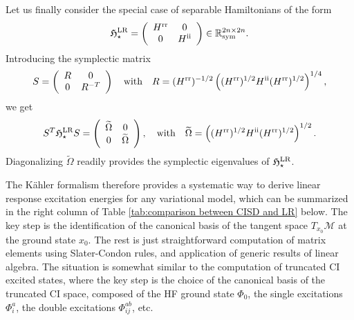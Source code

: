 \documentclass[11pt]{article}
\def\R{{\mathbb R}}
\begin{document}
\par
Let us finally consider the special case of separable Hamiltonians of the form
\begin{equation}\label{eq:separable_Hamiltonians}
\mathfrak H_\star^{\rm LR} = \left( \begin{array}{cc} H^{\rm rr} & 0 \\ 0 &   H^{\rm ii} \end{array} \right) \in \R^{2n \times 2n}_{\rm sym}.
\end{equation}
Introducing the symplectic matrix
$$
S = \left( \begin{array}{cc} R & 0 \\ 0 & R^{-T} \end{array} \right) \quad \mbox{with} \quad R = (H^{\rm rr})^{-1/2} \left( (H^{\rm rr})^{1/2} H^{\rm ii} (H^{\rm rr})^{1/2} \right)^{1/4},
$$
we get 
\begin{equation}\label{eq:angular_frequencies_separable_Hamiltonians}
S^T \mathfrak H_\star^{\rm LR} S =  \left( \begin{array}{cc} \widetilde \Omega & 0 \\ 0 & \widetilde \Omega \end{array} \right), \quad \mbox{with} \quad \widetilde \Omega =  \left( (H^{\rm rr})^{1/2} H^{\rm ii} (H^{\rm rr})^{1/2} \right)^{1/2}.
\end{equation}
Diagonalizing $\widetilde \Omega$ readily provides the symplectic eigenvalues of $\mathfrak H_\star^{\rm LR}$.

\medskip

The K\"ahler formalism therefore provides a systematic way to derive linear response excitation energies for any variational model, which can be summarized in the right column of Table \ref{tab:comparison between CISD and LR} below. The key step is the identification of the canonical basis of the tangent space $T_{x_0}\mathcal M$ at the ground state $x_0$. The rest is just straightforward computation of matrix elements using Slater-Condon rules, and application of generic results of linear algebra.  The situation is somewhat similar to the computation of truncated CI excited states, where the key step is the choice of the canonical basis of the truncated CI space, composed of the HF ground state $\Phi_0$, the single excitations $\Phi_i^a$, the double excitations $\Phi_{ij}^{ab}$, etc.
\end{document}
